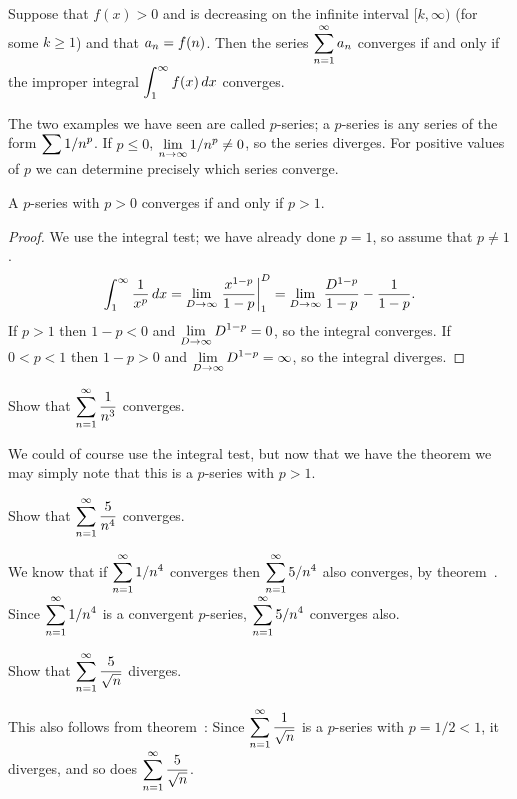 \begin{theorem} Suppose that $f(x)>0$ and is decreasing on the infinite interval
$[k,\infty)$ (for some $k\ge1$)
and that $\displaystyle a_n=f(n)$. Then the series
$\displaystyle\sum_{n=1}^\infty a_n$ converges if and only if the improper
integral $\displaystyle\int_{1}^\infty f(x)\,dx$ converges.
\end{theorem}

The two examples we have seen are called
$p$-series; a $p$-series is
any series of the form $\displaystyle \sum 1/n^p$. If $p\le0$, $\displaystyle\lim_{n\to\infty}
1/n^p\not=0$, so the series diverges. For positive values of $p$ we
can determine precisely which series converge.

\begin{theorem} A $p$-series with $p>0$ converges if and only if $p>1$.
\end{theorem}
\begin{proof}
We use the integral test; we have already done $p=1$, so assume that
$p\not=1$.
$$
  \int_1^{\infty} {1\over x^p}\,dx=\lim_{D\to\infty} \left.{x^{1-p}\over
  1-p}\right|_{1}^D=\lim_{D\to\infty} {D^{1-p}\over 1-p}-{1\over 1-p}.
$$
If $p>1$ then $1-p<0$ and $\displaystyle\lim_{D\to\infty}D^{1-p}=0$, so the
  integral converges. If $0<p<1$ then $1-p>0$ and 
$\displaystyle\lim_{D\to\infty}D^{1-p}=\infty$, so the integral diverges.
\end{proof}

\begin{example} Show that $\displaystyle\sum_{n=1}^\infty {1\over {n^3}}$ converges. 
\par\nobreak\ssk\noindent
We could of course use
the integral test, but now that we have the theorem we may simply note
that this is a $p$-series with $p>1$.
\end{example}

\begin{example} Show that $\displaystyle\sum_{n=1}^\infty {5\over n^4}$ converges. 
\par\nobreak\ssk\noindent
We know that if
$\displaystyle \sum_{n=1}^\infty 1/n^4$ converges then $\displaystyle \sum_{n=1}^\infty 5/n^4$
also converges, by theorem~. Since 
$\displaystyle \sum_{n=1}^\infty 1/n^4$ is a convergent $p$-series, 
 $\displaystyle \sum_{n=1}^\infty 5/n^4$ converges also.
\end{example}

\begin{example} Show that $\displaystyle\sum_{n=1}^\infty {5\over \sqrt{n}}$ diverges.
\par\nobreak\ssk\noindent This also follows from
theorem~: Since $\displaystyle\sum_{n=1}^\infty
{1\over \sqrt{n}}$ is a $p$-series with $p=1/2<1$, it diverges, and so
does $\displaystyle\sum_{n=1}^\infty {5\over \sqrt{n}}$.  
\end{example}

